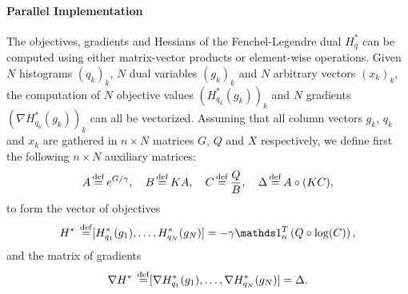 \paragraph{Parallel Implementation} The objectives, gradients and Hessians of the Fenchel-Legendre dual $H^*_q$ can be computed using either matrix-vector products or element-wise operations. Given $N$ histograms $(q_k)_k$, $N$ dual variables $(g_k)_k$ and $N$ arbitrary vectors $(x_k)_k$, the computation of $N$ objective values $(H_{q_k}^*(g_k))_k$ and $N$ gradients $(\nabla H_{q_k}^*(g_k))_k$ can all be vectorized. Assuming that all column vectors $g_k$, $q_k$ and $x_k$ are gathered in $n\times N$ matrices $G$, $Q$ and $X$ respectively, we define first the following $n\times N$ auxiliary matrices:
$$ A\operatorname{\overset{\operatorname{def}}{=}} e^{G/\gamma}, \quad B\operatorname{\overset{\operatorname{def}}{=}} K A, \quad C\operatorname{\overset{\operatorname{def}}{=}} \frac{Q}{B} , \quad  \Delta\operatorname{\overset{\operatorname{def}}{=}} A\circ (KC),$$
to form the vector of objectives
$$\label{eq:onehistoobj}H^*\; \defeq [ H_{q_1}^*(g_1),\dots, H_{q_N}^*(g_N)]= -\ga \ones_n^T \left(Q \circ \log(C)\right),$$
and the matrix of gradients 
\begin{equation}\label{eq:onehistograd}\nabla H^*\; \defeq [\nabla H_{q_1}^*(g_1),\dots,\nabla H_{q_N}^*(g_N)]=\Delta.\end{equation}






